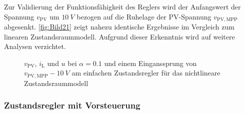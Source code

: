 Zur Validierung der Funktionsfähigkeit des Reglers wird der Anfangswert der Spannung $v_{\mathrm{PV}}$ um $\SI{10}{V}$ bezogen auf die Ruhelage der PV-Spannung $v_{\mathrm{PV,MPP}}$ abgesenkt. \autoref{fig:Bild21} zeigt nahezu identische Ergebnisse im Vergleich zum linearen Zustandsraummodell. Aufgrund dieser Erkenntnis wird auf weitere Analysen verzichtet.

\begin{figure}[H]
    \centering
    \caption[Validierung Regler mit einfacher Rückführung (nichtlinear)]{$v_{\mathrm{PV}}$, $i_{\mathrm{L}}$ und $u$ bei $\alpha = 0.1$ und einem Einganssprung von $v_{\mathrm{PV,MPP}} - \SI{10}{V}$ am einfachen Zustandsregler für das nichtlineare Zustandsraummodell}
    \label{fig:Bild21}
\end{figure}

\subsubsection{Zustandsregler mit Vorsteuerung} \label{sec:val_nlin_vor}

